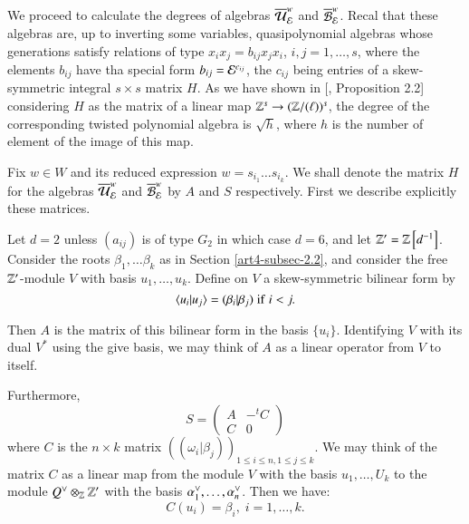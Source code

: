 \subsection{}\label{art4-subsec-3.2}
We proceed to calculate the degrees of algebras $\overline{\mathcal{U}}_{\mathcal{E}}^{w}$ and $\overline{\mathcal{B}}_{\mathcal{E}}^{w}$. Recal that these algebras are, up to inverting some variables, quasipolynomial algebras whose generations satisfy relations of type $x_{i}x_{j} = b_{ij}x_{j}x_{i}$, $i,j = 1, \ldots, s$, where the elements $b_{ij}$ have tha special form $b_{ij}= \mathcal{E}^{c_{ij}}$, the $c_{ij}$ being entries of a skew-symmetric integral $s \times s$ matrix $H$. As we have shown in
[\cite{art4-keyDKP2}, Proposition 2.2] considering $H$ as the matrix of a linear map $\mathbb{Z}^{s} \rightarrow (\mathbb{Z}/(\ell))^{s}$, the degree of the corresponding twisted polynomial algebra is $\sqrt{h}$, where $h$ is the number of element of the image of this map.

Fix $w \in W$ and its reduced expression $w = s_{i_{1}}\ldots s_{i_{k}}$. We shall denote the matrix $H$ for the algebras $\overline{\mathcal{U}}_{\mathcal{E}}^{w}$ and $\overline{\mathcal{B}}_{\mathcal{E}}^{w}$ by $A$ and $S$ respectively. First we describe explicitly these matrices.

Let $d=2$ unless $(a_{ij})$ is of type $G_{2}$ in which case $d=6$, and let $\mathbb{Z}' = \mathbb{Z}\left[d^{-1}\right]$. Consider the roots $\beta_{1}, \ldots \beta_{k}$ as in Section \ref{art4-subsec-2.2}, and consider the free $\mathbb{Z}'$-module $V$ with basis $u_{1}, \ldots, u_{k}$. Define on $V$ a skew-symmetric bilinear form by
$$
\langle u_{i} | u_{j}\rangle = (\beta_{i} | \beta_{j})\; {\rm if} \; i < j.
$$

\noindent
Then $A$ is the matrix of this bilinear form in the basis $\{u_{i}\}$. Identifying $V$ with its dual $V^{*}$ using the give basis, we may think of $A$ as a linear operator from $V$ to itself.

Furthermore,
$$
S =
\begin{pmatrix}
A  & -^{t}C\\
C & 0
\end{pmatrix}
$$
where $C$ is the $n\times k$ matrix $((\omega_{i} | \beta_{j}))_{1 \leq i \leq n, 1 \leq j \leq k}$. We may think of the matrix $C$ as a linear map from the module $V$ with the basis $u_{1}, \ldots, U_{k}$ to the module $Q\spcheck \otimes _{\bbZ}\bbZ'$ with the basis $\alpha_{1}\spcheck, \ldots, \alpha_{n}\spcheck$. Then we have:
\begin{equation}
C(u_{i}) = \beta_{i}, \; i =1,\ldots, k.\label{art4-eq3.2.1}
\end{equation}

